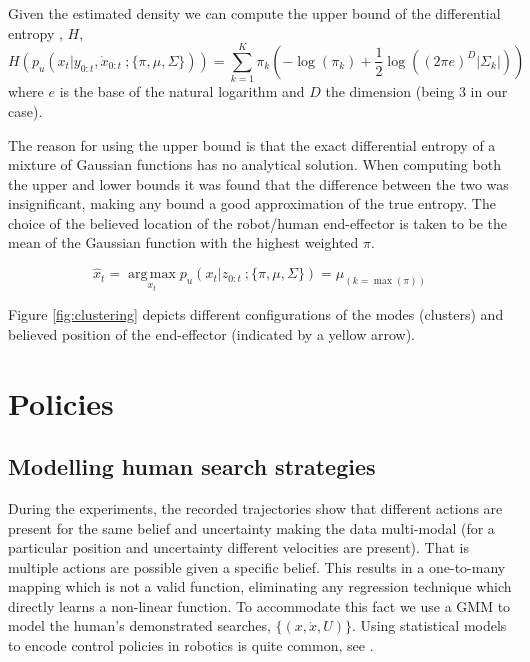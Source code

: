 Given the estimated density we can compute the upper bound of the differential entropy \cite{DiffEntropyHuber2008}, $H$,
\begin{equation}
  H\left(  p_u(x_t|y_{0:t},\dot{x}_{0:t}\: ;\{\pi,\mu,\Sigma\}) \right) = \sum\limits_{k=1}^{K} \pi_{k} \left( -\log(\pi_{k}) + \frac{1}{2} \log((2\pi e)^{D} |\Sigma_{k}|) \right)
\end{equation}
where $e$ is the base of the natural logarithm and $D$ the dimension (being 3 in our case).

The reason for using the upper bound is that the exact differential entropy of a mixture of Gaussian functions has no 
analytical solution. When computing both the
upper and lower bounds it was found that the difference between the two was insignificant, making any bound a good approximation 
of the true entropy. The choice of the believed location of the robot/human end-effector is taken to be the mean of the 
Gaussian function with the highest weighted $\pi$.

\begin{equation}
 \hat{x}_t = \operatorname*{arg\,max}_{x_t} p_u(x_{t}|z_{0:t}\: ;\{\pi,\mu,\Sigma\}) = \mu_{(k = \max(\pi))}
\end{equation}

Figure \ref{fig:clustering} depicts different configurations of the modes (clusters) and believed position of the end-effector (indicated by a yellow arrow).  





\section{Policies}\label{chap3:policies}

\subsection{Modelling human search strategies}\label{chap3:GMM_policy}

During the experiments, the recorded trajectories show that different actions are present for the same belief and uncertainty making the data multi-modal
(for a particular position and uncertainty different velocities are present). That is multiple actions are possible given a specific belief. 
This results in a one-to-many mapping which is not a valid function, eliminating any regression technique which directly learns a non-linear function. 
To accommodate this fact we use a GMM to model the human's demonstrated searches, $\{(x,\dot{x},U)\}$. 
Using statistical models to encode control policies in robotics is quite common, see \cite{BillardCDS08}. 

